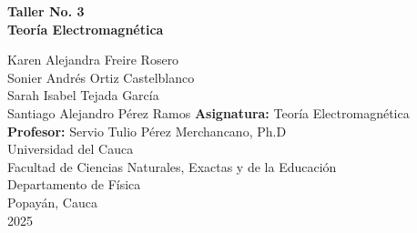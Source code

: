 \begin{titlepage}
        \begin{center}
            \LARGE \textbf{Taller No. 3\\Teoría Electromagnética}
            \vfill
            \large

            Karen Alejandra Freire Rosero\\
            Sonier Andrés Ortiz Castelblanco\\
            Sarah Isabel Tejada García\\
            Santiago Alejandro Pérez Ramos
            \vfill
            \textbf{Asignatura:} Teoría Electromagnética\\
            \textbf{Profesor:} Servio Tulio Pérez Merchancano, Ph.D\\
            \vfill
            Universidad del Cauca\\
            Facultad de Ciencias Naturales, Exactas y de la Educación\\
            Departamento de Física\\
            Popayán, Cauca\\
            2025
        \end{center}
\end{titlepage}